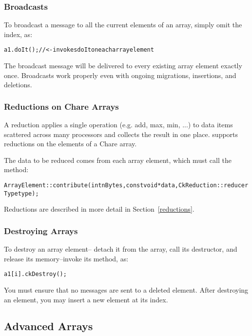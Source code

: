 \subsubsection{Broadcasts}
To  broadcast a message to all the current elements of an array, 
simply omit the index, as:

\begin{alltt}
a1.doIt(); //<- invokes doIt on each array element
\end{alltt}

The broadcast message will be delivered to every existing array 
element exactly once.  Broadcasts work properly even with ongoing
migrations, insertions, and deletions.


\subsubsection{Reductions on Chare Arrays}
A reduction applies a single operation (e.g. add,
max, min, ...) to data items scattered across many processors and
collects the result in one place.  \charmpp{} supports reductions on the
elements of a Chare array.

The data to be reduced comes from each array element, 
which must call the  method:

\begin{alltt}
ArrayElement::contribute(int nBytes,const void *data,CkReduction::reducerType type);
\end{alltt}

Reductions are described in more detail in Section~\ref{reductions}.


\subsubsection{Destroying Arrays}
To destroy an array element-- detach it from the array,
call its destructor, and release its memory--invoke its 
 method, as:

\begin{alltt}
a1[i].ckDestroy();
\end{alltt}

You must ensure that no messages are sent to a deleted element. 
After destroying an element, you may insert a new element at
its index.




\subsection{Advanced Arrays}

